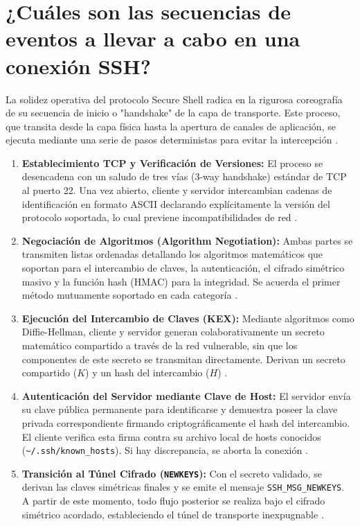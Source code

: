 \documentclass[a4paper,12pt]{article}
\begin{document}
\section{¿Cuáles son las secuencias de eventos a llevar a cabo en una conexión SSH?}

La solidez operativa del protocolo Secure Shell radica en la rigurosa coreografía de su secuencia de inicio o "handshake" de la capa de transporte. Este proceso, que transita desde la capa física hasta la apertura de canales de aplicación, se ejecuta mediante una serie de pasos deterministas para evitar la intercepción \cite{redhat_legacy_ssh}.

\begin{enumerate}
    \item \textbf{Establecimiento TCP y Verificación de Versiones:} El proceso se desencadena con un saludo de tres vías (3-way handshake) estándar de TCP al puerto 22. Una vez abierto, cliente y servidor intercambian cadenas de identificación en formato ASCII declarando explícitamente la versión del protocolo soportada, lo cual previene incompatibilidades de red \cite{cisco_ssh_handshake}.
    \item \textbf{Negociación de Algoritmos (Algorithm Negotiation):} Ambas partes se transmiten listas ordenadas detallando los algoritmos matemáticos que soportan para el intercambio de claves, la autenticación, el cifrado simétrico masivo y la función hash (HMAC) para la integridad. Se acuerda el primer método mutuamente soportado en cada categoría \cite{rfc4253_ietf}.
    \item \textbf{Ejecución del Intercambio de Claves (KEX):} Mediante algoritmos como Diffie-Hellman, cliente y servidor generan colaborativamente un secreto matemático compartido a través de la red vulnerable, sin que los componentes de este secreto se transmitan directamente. Derivan un secreto compartido ($K$) y un hash del intercambio ($H$) \cite{cisco_ssh_handshake}.
    \item \textbf{Autenticación del Servidor mediante Clave de Host:} El servidor envía su clave pública permanente para identificarse y demuestra poseer la clave privada correspondiente firmando criptográficamente el hash del intercambio. El cliente verifica esta firma contra su archivo local de hosts conocidos (\texttt{\textasciitilde{}/.ssh/known\_hosts}). Si hay discrepancia, se aborta la conexión \cite{redhat_legacy_ssh}.
    \item \textbf{Transición al Túnel Cifrado (\texttt{NEWKEYS}):} Con el secreto validado, se derivan las claves simétricas finales y se emite el mensaje \texttt{SSH\_MSG\_NEWKEYS}. A partir de este momento, todo flujo posterior se realiza bajo el cifrado simétrico acordado, estableciendo el túnel de transporte inexpugnable \cite{rfc4253_ietf}.
\end{enumerate}
\end{document}
